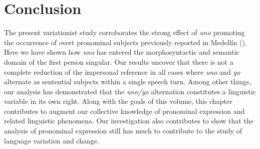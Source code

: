 \documentclass[output=paper]{langscibook}
\begin{document}
\section{Conclusion}\label{sec:orozco:6}


The present variationist study corroborates the strong effect of \textit{uno} promoting the occurrence of overt pronominal subjects previously reported in Medellín (\citealt[717]{OrozcoHurtado2021b}). Here we have shown how \textit{uno} has entered the morphosyntactic and semantic domain of the first person singular. Our results uncover that there is not a complete reduction of the impersonal reference in all cases where \textit{uno} and \textit{yo} alternate as sentential subjects within a single speech turn. Among other things, our analysis has demonstrated that the \textit{uno/yo} alternation constitutes a linguistic variable in its own right. Along with the goals of this volume, this chapter contributes to augment our collective knowledge of pronominal expression and related linguistic phenomena. Our investigation also contributes to show that the analysis of pronominal expression still has much to contribute to the study of language variation and change.  

\printbibliography[heading=subbibliography]
\end{document}
